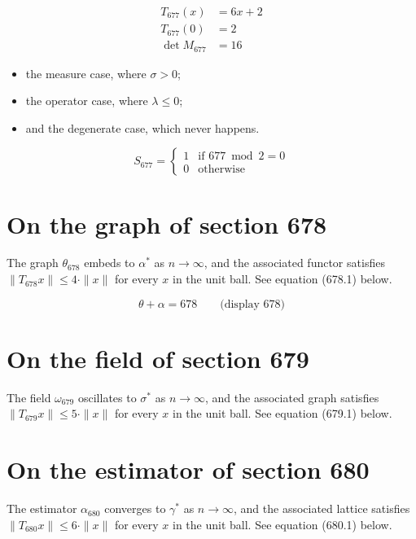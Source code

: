 \documentclass{article}
\begin{document}
\begin{align}
T_{677}(x) &= 6 x + 2 \\
T_{677}(0) &= 2 \\
\det M_{677} &= 16
\end{align}

\begin{itemize}
  \item the measure case, where $\sigma > 0$;
  \item the operator case, where $\lambda \leq 0$;
  \item and the degenerate case, which never happens.
\end{itemize}

\begin{equation}
S_{677} = \begin{cases} 1 & \text{if } 677 \bmod 2 = 0 \\ 0 & \text{otherwise} \end{cases}
\end{equation}

\section{On the graph of section 678}
The graph $\theta_{678}$ embeds to $\alpha^{*}$ as $n \to \infty$,
and the associated functor satisfies $\|T_{678} x\| \leq 4 \cdot \|x\|$
for every $x$ in the unit ball. See equation (678.1) below.

$$
\theta + \alpha = 678 \qquad \text{(display 678)}
$$

\section{On the field of section 679}
The field $\omega_{679}$ oscillates to $\sigma^{*}$ as $n \to \infty$,
and the associated graph satisfies $\|T_{679} x\| \leq 5 \cdot \|x\|$
for every $x$ in the unit ball. See equation (679.1) below.

\section{On the estimator of section 680}
The estimator $\alpha_{680}$ converges to $\gamma^{*}$ as $n \to \infty$,
and the associated lattice satisfies $\|T_{680} x\| \leq 6 \cdot \|x\|$
for every $x$ in the unit ball. See equation (680.1) below.
\end{document}
